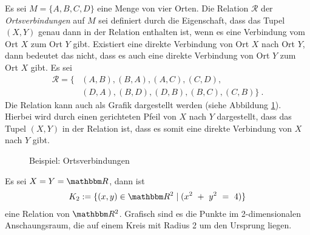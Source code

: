 \begin{Unit}[Beispiel]
  Es sei $M = \{A,B,C,D\}$ eine Menge von vier Orten. Die Relation 
  $\mathcal{R}$ der \emph{Ortsverbindungen} auf $M$ sei definiert durch die
  Eigenschaft, dass das Tupel $(X,Y)$ genau dann in der Relation enthalten 
  ist, wenn es eine Verbindung vom Ort $X$ zum Ort $Y$ gibt. Existiert eine 
  direkte Verbindung von Ort $X$ nach Ort $Y$, dann bedeutet das nicht, dass 
  es auch eine direkte Verbindung von Ort $Y$ zum Ort $X$ gibt. Es sei
  \begin{align}
    \mathcal{R} = \{ &(A,B), (B,A), (A,C), (C,D), \\
      & (D,A), (B,D), (D,B), (B,C), (C,B) \} \nonumber \ . 
  \end{align}
  Die Relation kann auch als Grafik dargestellt werden (siehe Abbildung
  \ref{abb:rel:Ortsverbindungen}). Hierbei wird durch einen gerichteten Pfeil 
  von $X$ nach $Y$ dargestellt, dass das Tupel $(X,Y)$ in der Relation ist, 
  dass   es somit eine direkte Verbindung von $X$ nach $Y$ gibt.

\begin{figure}[htbp]
\begin{center}
  \setlength{\unitlength}{1.0cm}
  \caption{Beispiel: Ortsverbindungen}
  \label{abb:rel:Ortsverbindungen}
\end{center}
\end{figure}
\end{Unit}

\begin{Unit}[Beispiel] 
  Es sei $X = Y = \mg{R}$, dann ist
  \begin{align}
    K_2 := \{(x,y) \in \RR^2 \mid  (x^2\ +\ y^2\ =\ 4) \} 
  \end{align}
  eine Relation von $\RR^2$. Grafisch sind es die Punkte im 2-dimensionalen 
  Anschaungsraum, die auf einem Kreis mit Radius 2 um den Ursprung liegen.
\end{Unit}

